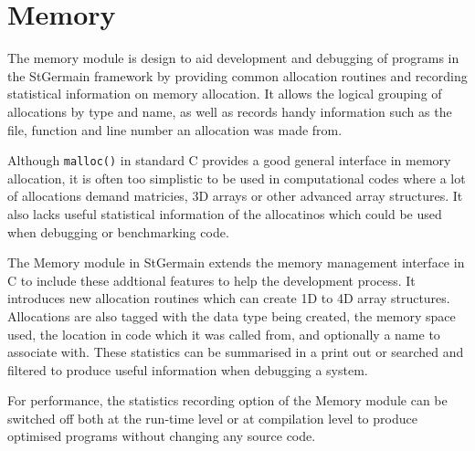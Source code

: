 \documentclass[a4paper,12pt]{article}
\date{}
\begin{document}
\section{Memory}
The memory module is design to aid development and debugging of programs in the StGermain framework by providing common allocation routines and recording statistical information on memory allocation. It allows the logical grouping of allocations by type and name, as well as records handy information such as the file, function and line number an allocation was made from.

Although \texttt{malloc()} in standard C provides a good general interface in memory allocation, it is often too simplistic to be used in computational codes where a lot of allocations demand matricies, 3D arrays or other advanced array structures. It also lacks useful statistical information of the allocatinos which could be used when debugging or benchmarking code.

The Memory module in StGermain extends the memory management interface in C to include these addtional features to help the development process. It introduces new allocation routines which can create 1D to 4D array structures. Allocations are also tagged with the data type being created, the memory space used, the location in code which it was called from, and optionally a name to associate with. These statistics can be summarised in a print out or searched and filtered to produce useful information when debugging a system.

For performance, the statistics recording option of the Memory module can be switched off both at the run-time level or at compilation level to produce optimised programs without changing any source code.
\end{document}
